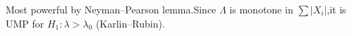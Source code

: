 \documentclass[preview]{standalone}
\begin{document}
\begin{center}
Most powerful by Neyman--Pearson lemma.Since $\Lambda$ is monotone in $\sum|X_i|$,it is UMP for $H_1: \lambda > \lambda_0$ (Karlin--Rubin).
\end{center}
\end{document}
